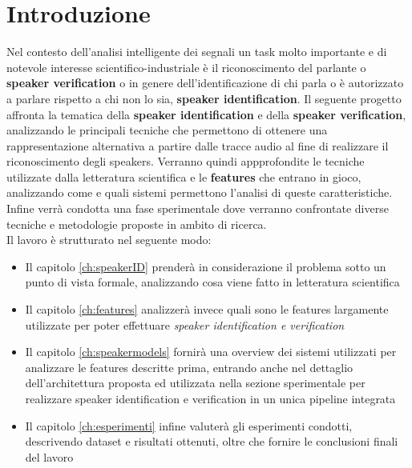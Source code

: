 \chapter{Introduzione}
Nel contesto dell'analisi intelligente dei segnali un task molto importante e di notevole interesse scientifico-industriale 
è il riconoscimento del parlante o \textbf{speaker verification} o in genere dell'identificazione di chi parla o è autorizzato a parlare rispetto a chi non lo sia, \textbf{speaker identification}. 
Il seguente progetto affronta la tematica della \textbf{speaker identification} e della \textbf{speaker verification}, analizzando le principali tecniche che permettono di ottenere
una rappresentazione alternativa a partire dalle tracce audio al fine di realizzare il riconoscimento degli speakers. 
Verranno quindi appprofondite le tecniche utilizzate dalla letteratura scientifica e le \textbf{features} che entrano in gioco, analizzando come e quali sistemi permettono l'analisi di queste
caratteristiche. Infine verrà condotta una fase sperimentale dove verranno confrontate diverse tecniche e metodologie proposte in ambito di ricerca. \\
Il lavoro è strutturato nel seguente modo:
\begin{itemize}
    \item Il capitolo \ref{ch:speakerID} prenderà in considerazione il problema sotto un punto di vista formale, analizzando cosa viene fatto in letteratura scientifica
    \item Il capitolo \ref{ch:features} analizzerà invece quali sono le features largamente utilizzate per poter effettuare \textit{speaker identification e verification }
    \item Il capitolo \ref{ch:speakermodels} fornirà una overview dei sistemi utilizzati per analizzare le features descritte prima, entrando anche nel dettaglio dell'architettura proposta ed utilizzata
        nella sezione sperimentale per realizzare speaker identification e verification in un unica pipeline integrata
    \item Il capitolo \ref{ch:esperimenti} infine valuterà gli esperimenti condotti, descrivendo dataset e risultati ottenuti, oltre che fornire le conclusioni finali del lavoro
\end{itemize}